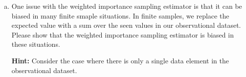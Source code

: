 \documentclass[12pt,letterpaper,boxed]{hmcpset}
\newcommand{\sumsa}{\sum_{(s,a)}}
\begin{document}
\begin{solution}
\begin{enumerate}[(a)]
    \begin{proof}
      We already showed that if $\hat \pi_0 = \pi_0$, then 
      \[
      \E_{\substack{s \sim p(s) \\ a \sim \pi_0 (s,a)}}\qty[\frac{\pi_1(s,a)}{\hat \pi_0 (s,a)} R(s,a)]  =  \E_{\substack{s \sim p(s) \\ a \sim \pi_1(s,a)}} [R(s,a)].
      \]
      For the denominator, if $\hat \pi_0 = \pi_0$, we have
      \[
      \begin{aligned}
        \E_{\substack{s \sim p(s) \\ a \sim \pi_0 (s,a)}}\qty[\frac{\pi_1(s,a)}{\hat \pi_0 (s,a)}] &= \sumsa \frac{\pi_1(s,a)}{\hat \pi_0 (s,a)} p(s) \pi_0(s,a) \\
        &= \sumsa \pi_1(s,a) p(s) \\
        &= \sumsa p(s,a \mid \pi_1) \\
        &= 1.
      \end{aligned}
      \]
      Hence,
      \[
        \frac{\E_{\substack{s \sim p(s) \\ a \sim \pi_0 (s,a)}}\qty[\frac{\pi_1(s,a)}{\hat \pi_0 (s,a)} R(s,a)] }{ \E_{\substack{s \sim p(s) \\ a \sim \pi_0 (s,a)}}\qty[\frac{\pi_1(s,a)}{\hat \pi_0 (s,a)}] } = \E_{\substack{s \sim p(s) \\ a \sim \pi_1(s,a)}} \qty[R(s,a)]
      \]
      when $\hat \pi_0 = \pi_0$, as desired.
    \end{proof}

    \item One issue with the weighted importance sampling estimator is that it can be biased in many finite smaple situations. In finite samples, we replace the expected value with a sum over the seen values in our observational dataset. Please show that the weighted importance sampling estimator is biased in these situations.
    
    \textbf{Hint:} Consider the case where there is only a single data element in the observational dataset.


\end{enumerate}
\end{solution}
\end{document}

